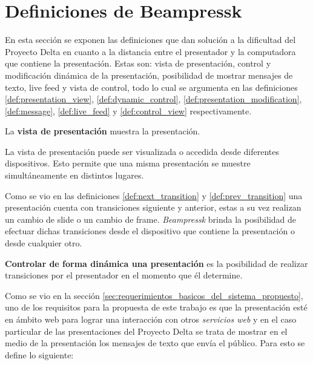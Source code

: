 	\section{Definiciones de Beampressk} %
	\label{sec:definiciones_de_beampressk}

		 En esta sección se exponen las definiciones que dan solución a la dificultad del Proyecto Delta en cuanto a la distancia entre el presentador y la computadora que contiene la presentación. Estas son: vista de presentación, control y modificación dinámica de la presentación, posibilidad de mostrar mensajes de texto, live feed y vista de control, todo lo cual se argumenta en las definiciones \ref{def:presentation_view}, \ref{def:dynamic_control}, \ref{def:presentation_modification}, \ref{def:message}, \ref{def:live_feed} y \ref{def:control_view} respectivamente. %

		\begin{definition}
		\label{def:presentation_view}
			La \textbf{vista de presentación} muestra la presentación. 
		\end{definition}

		La vista de presentación puede ser visualizada o accedida desde diferentes dispositivos. Esto permite que una misma presentación se muestre simultáneamente en distintos lugares.

		Como se vio en las definiciones \ref{def:next_transition} y \ref{def:prev_transition} una presentación cuenta con transiciones siguiente y anterior, estas a su vez realizan un cambio de slide o un cambio de frame. \textit{Beampressk} brinda la posibilidad de efectuar dichas transiciones desde el dispositivo que contiene la presentación o desde cualquier otro.


		\begin{definition}
		\label{def:dynamic_control}
			\textbf{Controlar de forma dinámica una presentación} es la posibilidad de realizar transiciones por el presentador en el momento que él determine.
		\end{definition}



		Como se vio en la sección \ref{sec:requerimientos_basicos_del_sistema_propuesto}, uno de los requisitos para la propuesta de este trabajo es que la presentación esté en ámbito web para lograr una interacción con otros \textit{servicios web} y en el caso particular de las presentaciones del Proyecto Delta se trata de mostrar en el medio de la presentación los mensajes de texto que envía el público. Para esto se define lo siguiente: 

